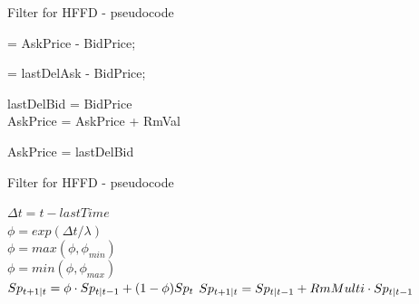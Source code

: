 \documentclass{beamer}
\begin{document}
\begin{frame}{Filter for HFFD - pseudocode}
\small
\begin{algorithm}[H]

\Spt = AskPrice - BidPrice; 



\label{War1}
{
\Spt = lastDelAsk - BidPrice; 

	{
		lastDelBid = BidPrice\\
		AskPrice = AskPrice + RmVal\\


	
	}
	
AskPrice = lastDelBid
	
}

\caption{Filter for Bid price\label{FiltrBID}}
\end{algorithm}

\end{frame}

\begin{frame}{Filter for HFFD - pseudocode}

\begin{algorithm}[H]

{ $\Delta t = t - lastTime$\\
$\phi = exp(\Delta t / \lambda)$\\
$\phi = max(\phi, \phi_{min})$\\
$\phi = min(\phi, \phi_{max})$ \\ 
$Sp_{t+1|t} = \phi \cdot Sp_{t|t-1} + (1 - \phi) Sp_{t}$
}
{
$Sp_{t+1|t} = Sp_{t|t-1} + RmMulti \cdot Sp_{t|t-1}$\\
}

\caption{\MSpn update\label{FiltrUpdate}}
\end{algorithm}

\end{frame}
\end{document}
